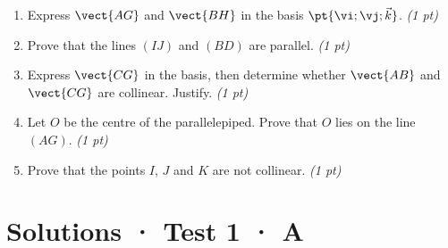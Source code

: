 \begin{enumerate}

\item Express $\vect{AG}$ and $\vect{BH}$ in the basis $\pt{\vi;\vj;\vec k}$. \hfill\textit{(1 pt)}

\item Prove that the lines $(IJ)$ and $(BD)$ are parallel. \hfill\textit{(1 pt)}

\item Express $\vect{CG}$ in the basis, then determine whether $\vect{AB}$ and $\vect{CG}$ are collinear. Justify. \hfill\textit{(1 pt)}

\item Let $O$ be the centre of the parallelepiped. Prove that $O$ lies on the line $(AG)$. \hfill\textit{(1 pt)}

\item Prove that the points $I$, $J$ and $K$ are not collinear. \hfill\textit{(1 pt)}

\end{enumerate}

\ifmxteacher\mxnewpage

\section*{Solutions · Test 1 · A}\label{cor:1-3}

